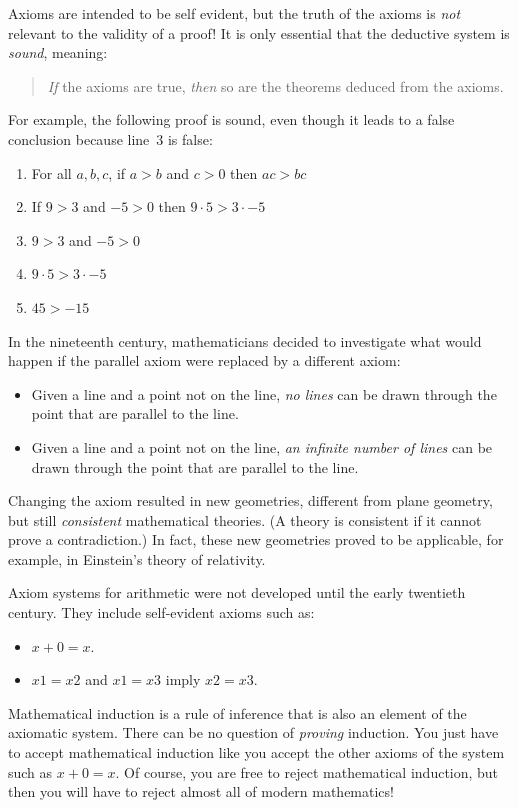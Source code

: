 \documentclass[11pt,a4paper]{report}
\begin{document}
Axioms are intended to be self evident, but the truth of the axioms is \emph{not} relevant to the validity of a proof! It is only essential that the deductive system is \emph{sound}, meaning:
\begin{quote}
\emph{If} the axioms are true, \emph{then} so are the theorems deduced from the axioms.
\end{quote}
For example, the following proof is sound, even though it leads to a false conclusion because line~3 is false:
\begin{enumerate}
\item For all $a,b,c$, if $a>b$ and $c>0$ then $ac>bc$
\item If $9>3$ and $-5>0$ then $9\cdot 5> 3\cdot -5$
\item $9>3$ and $-5>0$
\item $9\cdot 5> 3\cdot -5$
\item $45>-15$
\end{enumerate}

In the nineteenth century, mathematicians decided to investigate what would happen if the parallel axiom were replaced by a different axiom:
\begin{itemize}
\item Given a line and a point not on the line, \emph{no lines} can be drawn through the point that are parallel to the line.
\item Given a line and a point not on the line, \emph{an infinite number of lines} can be drawn through the point that are parallel to the line.
\end{itemize}
Changing the axiom resulted in new geometries, different from plane geometry, but still \emph{consistent} mathematical theories. (A theory is consistent if it cannot prove a contradiction.) In fact, these new geometries proved to be applicable, for example, in Einstein's theory of relativity.

Axiom systems for arithmetic were not developed until the early twentieth century. They include self-evident axioms such as:
\begin{itemize}
\item $x+0=x$.
\item $x1=x2$ and $x1=x3$ imply $x2=x3$.
\end{itemize}
Mathematical induction is a rule of inference that is also an element of the axiomatic system. There can be no question of \emph{proving} induction. You just have to accept mathematical induction like you accept the other axioms of the system such as $x+0=x$. Of course, you are free to reject mathematical induction, but then you will have to reject almost all of modern mathematics!
\end{document}
